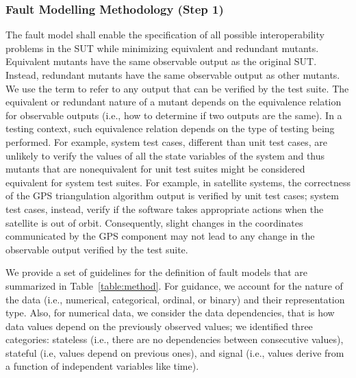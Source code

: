 \subsubsection{Fault Modelling Methodology (Step 1)}
\label{sec:methodology}



The fault model shall enable the specification of 
all possible interoperability problems in the SUT while minimizing equivalent and redundant mutants.
Equivalent mutants have the same observable output as the original SUT. 
Instead, redundant mutants have the same observable output as other mutants.
We use the term  to refer to any output that can be verified by the test suite.
The equivalent or redundant nature of a mutant depends
on the equivalence relation for observable outputs
(i.e., how to determine if two outputs are the same).
In a testing context, such equivalence relation depends on the type of testing being performed. For example, system test cases, different than unit test cases,  are unlikely to verify the values of all the state variables of the system and thus mutants that are nonequivalent for unit test suites might be considered equivalent for system test suites. 
For example, in satellite systems, the correctness of the GPS triangulation algorithm output is verified by unit test cases; system test cases, instead, verify 
if the software takes appropriate actions when the satellite is out of orbit. Consequently, slight changes in the coordinates communicated by the GPS component may not lead to any change in the observable output verified by the test suite.


We provide a set of guidelines for the definition of fault models that 
are summarized in Table~\ref{table:method}. 
For guidance,
we account for the nature of the data (i.e., numerical, categorical, ordinal, or binary) and their representation type.
Also, for numerical data, 
we consider 
the data dependencies, that is how data values depend on the previously observed values; we identified three categories: stateless (i.e., there are no dependencies between consecutive values), stateful (i.e, values depend on previous ones), and signal (i.e., values derive from a function of independent variables like time).

